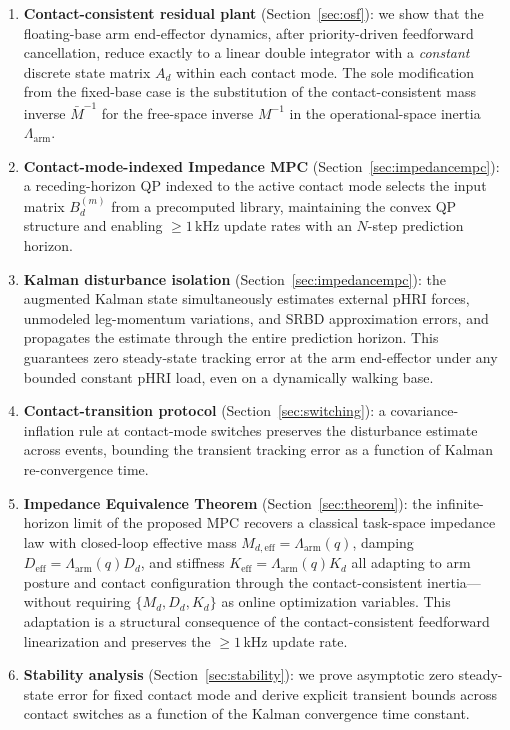 \documentclass[journal]{IEEEtran}
\newcommand{\Mbar}{\bar{M}^{-1}}
\newcommand{\Larm}{\Lambda_{\text{arm}}}
\begin{document}
\begin{enumerate}
\item \textbf{Contact-consistent residual plant} (Section~\ref{sec:osf}):
we show that the floating-base arm end-effector dynamics, after
priority-driven feedforward cancellation, reduce exactly to a linear double
integrator with a \emph{constant} discrete state matrix $A_d$ within each
contact mode. The sole modification from the fixed-base case is the
substitution of the contact-consistent mass inverse $\Mbar$ for the
free-space inverse $M^{-1}$ in the operational-space inertia $\Larm$.

\item \textbf{Contact-mode-indexed Impedance MPC}
(Section~\ref{sec:impedancempc}): a receding-horizon QP indexed to the
active contact mode selects the input matrix $B_d^{(m)}$ from a
precomputed library, maintaining the convex QP structure and enabling
${\geq}1$\,kHz update rates with an $N$-step prediction horizon.

\item \textbf{Kalman disturbance isolation}
(Section~\ref{sec:impedancempc}): the augmented Kalman state simultaneously
estimates external pHRI forces, unmodeled leg-momentum variations, and SRBD
approximation errors, and propagates the estimate through the entire
prediction horizon. This guarantees zero steady-state tracking error at the
arm end-effector under any bounded constant pHRI load, even on a
dynamically walking base.

\item \textbf{Contact-transition protocol} (Section~\ref{sec:switching}):
a covariance-inflation rule at contact-mode switches preserves the
disturbance estimate across events, bounding the transient tracking error
as a function of Kalman re-convergence time.

\item \textbf{Impedance Equivalence Theorem} (Section~\ref{sec:theorem}):
the infinite-horizon limit of the proposed MPC recovers a classical
task-space impedance law with closed-loop effective mass
$M_{d,\text{eff}}=\Larm(q)$, damping $D_{\text{eff}}=\Larm(q)D_d$, and
stiffness $K_{\text{eff}}=\Larm(q)K_d$ all adapting to arm posture and
contact configuration through the contact-consistent inertia---without
requiring $\{M_d,D_d,K_d\}$ as online optimization variables. This
adaptation is a structural consequence of the contact-consistent feedforward
linearization and preserves the ${\geq}1$\,kHz update rate.

\item \textbf{Stability analysis} (Section~\ref{sec:stability}): we prove
asymptotic zero steady-state error for fixed contact mode and derive
explicit transient bounds across contact switches as a function of the
Kalman convergence time constant.
\end{enumerate}
\end{document}
